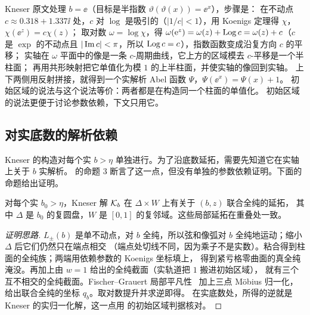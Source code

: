 \begin{remark}\label{ch10:rem:kneser-original}
Kneser 原文处理 $b=\ee$（目标是半指数 $\vartheta(\vartheta(x))=\ee^x$），步骤是：
在不动点 $c\approx0.318+1.337\ii$ 处，$c$ 对 $\log$ 是吸引的（$|1/c|<1$），用 Koenigs 定理得 $\chi$，$\chi(\ee^z)=c\chi(z)$；
取对数 $\omega=\log\chi$，得 $\omega(\mathrm{e}^z)=\omega(z)+\operatorname{Log} c=\omega(z)+c$（$c$ 是 $\exp$ 的不动点且 $|\operatorname{Im} c|<\pi$，所以 $\operatorname{Log} c=c$），指数函数变成沿复方向 $c$ 的平移；
实轴在 $\omega$ 平面中的像是一条 $c$-周期曲线，它上方的区域模去 $c$-平移是一个半柱面；
再用共形映射把它单值化为模 $1$ 的上半柱面，并使实轴的像回到实轴。
上下两侧用反射拼接，就得到一个实解析 Abel 函数 $\Psi$，$\Psi(\ee^x)=\Psi(x)+1$。
初始区域的说法与这个说法等价：两者都是在构造同一个柱面的单值化。
初始区域的说法更便于讨论参数依赖，下文只用它。
\end{remark}

\subsection{对实底数的解析依赖}

Kneser 的构造对每个实 $b>\eta$ 单独进行。为了沿底数延拓，需要先知道它在实轴上关于 $b$ 实解析。
\cite{Paulsen2019} 的命题 3 断言了这一点，但没有单独的参数依赖证明。下面的命题给出证明。

\begin{proposition}\label{ch10:prop:exterior-real}
对每个实 $b_0>\eta$，Kneser 解 $\mathcal K_b$ 在 $\Delta\times W$ 上有关于 $(b,z)$ 联合全纯的延拓，
其中 $\Delta$ 是 $b_0$ 的复圆盘，$W$ 是 $[0,1]$ 的复邻域。这些局部延拓在重叠处一致。
\end{proposition}

\begin{proof}[证明思路]
$L_\pm(b)$ 是单不动点，对 $b$ 全纯，所以弦和像弧对 $b$ 全纯地运动；缩小 $\Delta$ 后它们仍然只在端点相交
（端点处切线不同，因为乘子不是实数）。粘合得到柱面的全纯族；两端用依赖参数的 Koenigs 坐标填上，
得到紧亏格零曲面的真全纯淹没。再加上由 $w=1$ 给出的全纯截面（实轨道把 $1$ 搬进初始区域），
就有三个互不相交的全纯截面。Fischer--Grauert 局部平凡性~\cite{FischerGrauert1965}
加上三点 Möbius 归一化，给出联合全纯的坐标 $q_b$。取对数提升并求逆即得。
在实底数处，所得的逆就是 Kneser 的实归一化解，这一点用 \cite[定理~1、定理~5]{TrappmannKouznetsov2011} 的初始区域判据核对。
\end{proof}

